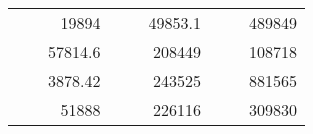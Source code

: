 \begin{table}[H]
\begin{tabular}{|ccrccrccc}
\rowcolor[HTML]{DDFDFF} 
\multicolumn{1}{|c|}{\cellcolor[HTML]{FFFFC7}}                                & \multicolumn{1}{c|}{\cellcolor[HTML]{DDFDFF}}                      & \multicolumn{1}{r|}{\cellcolor[HTML]{DAE8FC}19894}     & \multicolumn{1}{c|}{\cellcolor[HTML]{FFFFC7}}                                & \multicolumn{1}{c|}{\cellcolor[HTML]{DDFDFF}}                       & \multicolumn{1}{r|}{\cellcolor[HTML]{DDFDFF}49853.1}   & \multicolumn{1}{c|}{\cellcolor[HTML]{FFFFC7}}                                & \multicolumn{1}{c|}{\cellcolor[HTML]{DDFDFF}}                      & \multicolumn{1}{r|}{\cellcolor[HTML]{DDFDFF}489849}    \\ \cline{3-3} \cline{6-6} \cline{9-9} 
\multicolumn{1}{|c|}{\cellcolor[HTML]{FFFFC7}}                                & \multicolumn{1}{c|}{\cellcolor[HTML]{DDFDFF}}                      & \multicolumn{1}{r|}{\cellcolor[HTML]{DDFDFF}57814.6}   & \multicolumn{1}{c|}{\cellcolor[HTML]{FFFFC7}}                                & \multicolumn{1}{c|}{\cellcolor[HTML]{DDFDFF}}                       & \multicolumn{1}{r|}{\cellcolor[HTML]{DAE8FC}208449}    & \multicolumn{1}{c|}{\cellcolor[HTML]{FFFFC7}}                                & \multicolumn{1}{c|}{\cellcolor[HTML]{DDFDFF}}                      & \multicolumn{1}{r|}{\cellcolor[HTML]{DAE8FC}108718}    \\ \cline{3-3} \cline{6-6} \cline{9-9} 
\rowcolor[HTML]{DDFDFF} 
\multicolumn{1}{|c|}{\cellcolor[HTML]{FFFFC7}}                                & \multicolumn{1}{c|}{\cellcolor[HTML]{DDFDFF}}                      & \multicolumn{1}{r|}{\cellcolor[HTML]{DAE8FC}3878.42}   & \multicolumn{1}{c|}{\cellcolor[HTML]{FFFFC7}}                                & \multicolumn{1}{c|}{\cellcolor[HTML]{DDFDFF}}                       & \multicolumn{1}{r|}{\cellcolor[HTML]{DDFDFF}243525}    & \multicolumn{1}{c|}{\cellcolor[HTML]{FFFFC7}}                                & \multicolumn{1}{c|}{\cellcolor[HTML]{DDFDFF}}                      & \multicolumn{1}{r|}{\cellcolor[HTML]{DDFDFF}881565}    \\ \cline{3-3} \cline{6-6} \cline{9-9} 
\multicolumn{1}{|c|}{\cellcolor[HTML]{FFFFC7}}                                & \multicolumn{1}{c|}{\cellcolor[HTML]{DDFDFF}}                      & \multicolumn{1}{r|}{\cellcolor[HTML]{DDFDFF}51888}     & \multicolumn{1}{c|}{\cellcolor[HTML]{FFFFC7}}                                & \multicolumn{1}{c|}{\cellcolor[HTML]{DDFDFF}}                       & \multicolumn{1}{r|}{\cellcolor[HTML]{DAE8FC}226116}    & \multicolumn{1}{c|}{\cellcolor[HTML]{FFFFC7}}                                & \multicolumn{1}{c|}{\cellcolor[HTML]{DDFDFF}}                      & \multicolumn{1}{r|}{\cellcolor[HTML]{DAE8FC}309830}    \\ \cline{3-3} \cline{6-6} \cline{9-9} 

\end{tabular}
\end{table}
